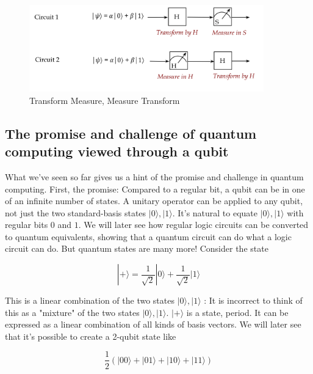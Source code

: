 \documentclass[main.tex]{subfiles}
\begin{document}
    \begin{figure}
        \centering
        \includegraphics[width=4in]{notes/figs/n05/22gate4.png}
        \caption{Transform Measure, Measure Transform}
        \label{fig:22gate4}
    \end{figure}
    
\subsection{The promise and challenge of quantum computing viewed through a qubit}

    What we've seen so far gives us a hint of the promise and challenge in quantum computing. First, the promise: Compared to a regular bit, a qubit can be in one of an infinite number of states. A unitary operator can be applied to any qubit, not just the two standard-basis states $|0\rangle,|1\rangle$. It's natural to equate $|0\rangle,|1\rangle$ with regular bits 0 and $1 .$ We will later see how regular logic circuits can be converted to quantum equivalents, showing that a quantum circuit can do what a logic circuit can do. But quantum states are many more! Consider the state
    
    $$
    |+\rangle=\frac{1}{\sqrt{2}}|0\rangle+\frac{1}{\sqrt{2}}|1\rangle
    $$
    
    This is a linear combination of the two states $|0\rangle,|1\rangle$ : It is incorrect to think of this as a "mixture" of the two states $|0\rangle,|1\rangle$. $|+\rangle$ is a state, period. It can be expressed as a linear combination of all kinds of basis vectors. We will later see that it's possible to create a 2-qubit state like
    
    $$
    \frac{1}{2}(|00\rangle+|01\rangle+|10\rangle+|11\rangle)
    $$
    
\end{document}
